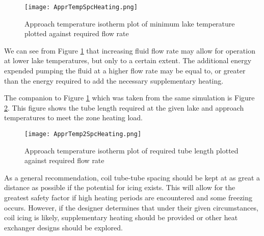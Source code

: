 	\begin{figure}
		\centering
		\texttt{[image: ApprTempSpcHeating.png]}
		\caption[Approach temperature isotherm for space heating]{Approach temperature isotherm plot of minimum lake temperature plotted against required flow rate}
		\label{fig:DesignTools:SpcHeating:ApprTempSpcHeating}
	\end{figure}

We can see from Figure \ref{fig:DesignTools:SpcHeating:ApprTempSpcHeating} that increasing fluid flow rate may allow for operation at lower lake temperatures, but only to a certain extent. The additional energy expended pumping the fluid at a higher flow rate may be equal to, or greater than the energy required to add the necessary supplementary heating.

The companion to Figure \ref{fig:DesignTools:SpcHeating:ApprTempSpcHeating} which was taken from the same simulation is Figure \ref{fig:DesignTools:SpcHeating:ApprTemp2SpcHeating}. This figure shows the tube length required at the given lake and approach temperatures to meet the zone heating load.

	\begin{figure}
		\centering
		\texttt{[image: ApprTemp2SpcHeating.png]}
		\caption[Approach temperature isotherm for space heating]{Approach temperature isotherm plot of required tube length plotted against required flow rate}
		\label{fig:DesignTools:SpcHeating:ApprTemp2SpcHeating}
	\end{figure}

As a general recommendation, coil tube-tube spacing should be kept at as great a distance as possible if the potential for icing exists. This will allow for the greatest safety factor if high heating periods are encountered and some freezing occurs. However, if the designer determines that under their given circumstances, coil icing is likely, supplementary heating should be provided or other heat exchanger designs should be explored.

